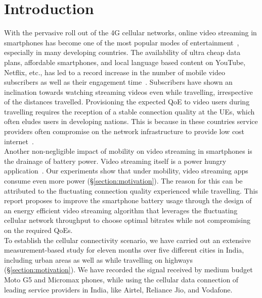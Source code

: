 \section{\textbf{Introduction}}\label{section:intro}
With the pervasive roll out of the \ac{4G} cellular networks, online video streaming in smartphones has become one of the most popular modes of entertainment~\cite{CISCO2019}, especially in many developing countries. The availability of ultra cheap data plans, affordable smartphones, and local language based content on YouTube, Netflix, etc., has led to a record increase in the number of mobile video subscribers as well as their engagement time~\cite{Mobstat_2019}.  Subscribers have  shown an inclination towards watching streaming videos even while travelling, irrespective of the distances travelled. Provisioning the expected \ac{QoE} to video users during travelling requires the reception of a stable connection quality at the \acp{UE}, which often eludes users in developing nations. This is because in these countries service providers often compromise on the network infrastructure to provide low cost internet~\cite{Poor_Inf_2019_2}. \\
\indent Another non-negligible impact of mobility on video streaming in  smartphones is the drainage of battery power.  Video streaming itself is a power hungry application~\cite{Xin2012}. Our experiments show that under mobility, video streaming apps consume even more power (\S\ref{section:motivation}). The reason for this can be attributed to the fluctuating connection quality experienced while travelling.  This report proposes to improve the smartphone battery usage through the design of an energy efficient video streaming algorithm that leverages the fluctuating cellular network throughput to choose optimal bitrates while not compromising on the required \ac{QoE}s. \\
\indent To establish the cellular connectivity scenario, 
we have carried out an extensive measurement-based study for eleven months over five different cities in India, including urban areas as well as while travelling on highways (\S\ref{section:motivation}). We have recorded the signal received by  medium budget Moto G5 and Micromax phones, while using the cellular data connection of leading service providers in India, like Airtel, Reliance Jio, and Vodafone. 


